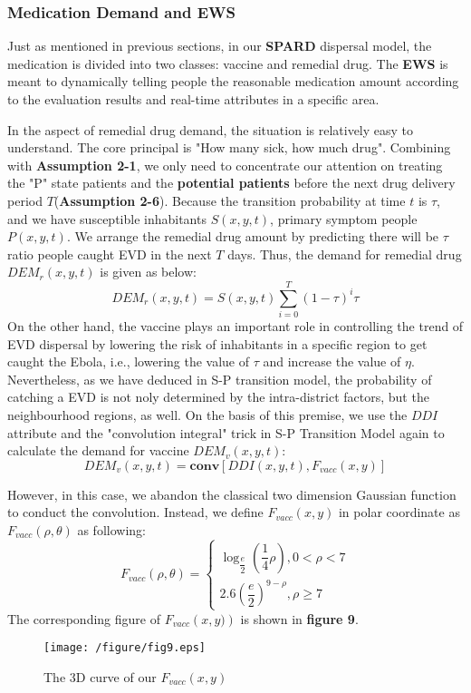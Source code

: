 \subsubsection{Medication Demand and EWS}
Just as mentioned in previous sections, in our \textbf{SPARD} dispersal model, the medication is divided into two classes: vaccine and remedial drug. The \textbf{EWS} is meant to dynamically telling people the reasonable medication amount according to the evaluation results and real-time attributes in a specific area.

In the aspect of remedial drug demand, the situation is relatively easy to understand. The core principal is "How many sick, how much drug". Combining with \textbf{Assumption 2-1}, we only need to concentrate our attention on treating the "P" state patients and the \textbf{potential patients} before the next drug delivery period $T$(\textbf{Assumption 2-6}). Because the transition probability at time $t$ is $\tau$, and we have susceptible  inhabitants $S(x,y,t)$, primary symptom people $P(x,y,t)$. We arrange the remedial drug amount by predicting there will be $\tau$ ratio people caught EVD in the next $T$ days. Thus, the demand for remedial drug $DEM_{r}(x,y,t)$ is given as below:
\begin{equation}
DEM_{r}(x,y,t)=S\left( x,y,t\right) \sum ^{T}_{i=0}\left( 1-\tau \right) ^{i}\tau 
\end{equation}
On the other hand, the vaccine plays an important role in controlling the trend of EVD dispersal by lowering the risk of  inhabitants in a specific region to get caught the Ebola, i.e., lowering the value of $\tau$ and increase the value of $\eta$. Nevertheless, as we have deduced in S-P transition model, the probability of catching a EVD is not noly determined by the intra-district factors, but the neighbourhood regions, as well. On the basis of this premise, we use the $DDI$ attribute and the "convolution integral" trick in S-P Transition Model again to calculate the demand for vaccine $DEM_{v}(x,y,t)$:
\begin{equation}
DEM_{v} \left( x,y,t\right) =\textbf{conv}\left[ DDI\left( x,y,t\right) ,F_{vacc}\left( x,y\right) \right]
\end{equation}

However, in this case, we abandon the classical two dimension Gaussian function  to conduct the convolution. Instead, we define $F_{vacc}\left( x,y\right) $ in polar coordinate as $F_{vacc}\left(\rho,\theta\right)$ as following:
\begin{equation}
F_{vacc}\left(\rho,\theta\right) =
\left\{
\begin{aligned}
\log _{\dfrac {e}{2}}\left( \dfrac {1}{4}\rho\right), 0<\rho<7 \\
2.6\left( \dfrac {e}{2}\right) ^{9-\rho}, \rho\geq7
\end{aligned}
\right.
\end{equation}
The corresponding figure of $F_{vacc}\left(x,y)\right)$ is shown in \textbf{figure 9}.
\begin{figure}[htbp]
\centering
\texttt{[image: /figure/fig9.eps]}
\caption{The 3D curve of our $F_{vacc}(x,y)$}\label{fig:9}
\end{figure}

